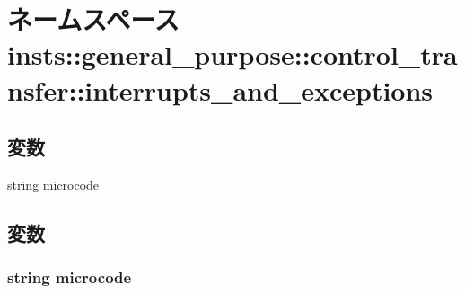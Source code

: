 \hypertarget{namespaceinsts_1_1general__purpose_1_1control__transfer_1_1interrupts__and__exceptions}{
\section{ネームスペース insts::general\_\-purpose::control\_\-transfer::interrupts\_\-and\_\-exceptions}
\label{namespaceinsts_1_1general__purpose_1_1control__transfer_1_1interrupts__and__exceptions}
}
\subsection*{変数}
\begin{DoxyCompactItemize}
\item 
string \hyperlink{namespaceinsts_1_1general__purpose_1_1control__transfer_1_1interrupts__and__exceptions_a770f11a173e99389a8802f0107ed8f52}{microcode}
\end{DoxyCompactItemize}


\subsection{変数}
\hypertarget{namespaceinsts_1_1general__purpose_1_1control__transfer_1_1interrupts__and__exceptions_a770f11a173e99389a8802f0107ed8f52}{
\subsubsection[{microcode}]{\setlength{\rightskip}{0pt plus 5cm}string {\bf microcode}}}
\label{namespaceinsts_1_1general__purpose_1_1control__transfer_1_1interrupts__and__exceptions_a770f11a173e99389a8802f0107ed8f52}
